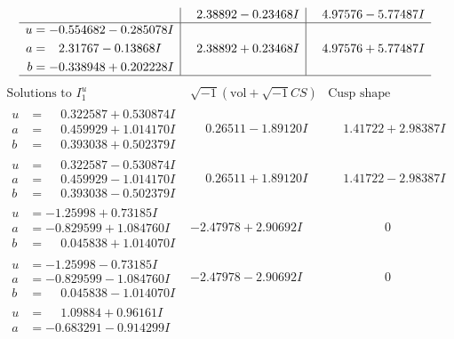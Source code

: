 \documentclass[1p]{elsarticle_modified}
\theoremstyle{definition}
\newcommand{\I}{\sqrt{-1}}
\begin{document}
$$\begin{array}{c|c|c}
 & \phantom{-}2.38892 - 0.23468 I & \phantom{-}4.97576 - 5.77487 I \\ \hline\begin{aligned}
u &= -0.554682 - 0.285078 I \\
a &= \phantom{-}2.31767 - 0.13868 I \\
b &= -0.338948 + 0.202228 I\end{aligned}
 & \phantom{-}2.38892 + 0.23468 I & \phantom{-}4.97576 + 5.77487 I\\
 \hline 
 \end{array}$$\newpage$$\begin{array}{c|c|c}  
\text{Solutions to }I^u_{1}& \I (\text{vol} + \sqrt{-1}CS) & \text{Cusp shape}\\
 \hline 
\begin{aligned}
u &= \phantom{-}0.322587 + 0.530874 I \\
a &= \phantom{-}0.459929 + 1.014170 I \\
b &= \phantom{-}0.393038 + 0.502379 I\end{aligned}
 & \phantom{-}0.26511 - 1.89120 I & \phantom{-}1.41722 + 2.98387 I \\ \hline\begin{aligned}
u &= \phantom{-}0.322587 - 0.530874 I \\
a &= \phantom{-}0.459929 - 1.014170 I \\
b &= \phantom{-}0.393038 - 0.502379 I\end{aligned}
 & \phantom{-}0.26511 + 1.89120 I & \phantom{-}1.41722 - 2.98387 I \\ \hline\begin{aligned}
u &= -1.25998 + 0.73185 I \\
a &= -0.829599 + 1.084760 I \\
b &= \phantom{-}0.045838 + 1.014070 I\end{aligned}
 & -2.47978 + 2.90692 I & \phantom{-0.000000 } 0 \\ \hline\begin{aligned}
u &= -1.25998 - 0.73185 I \\
a &= -0.829599 - 1.084760 I \\
b &= \phantom{-}0.045838 - 1.014070 I\end{aligned}
 & -2.47978 - 2.90692 I & \phantom{-0.000000 } 0 \\ \hline\begin{aligned}
u &= \phantom{-}1.09884 + 0.96161 I \\
a &= -0.683291 - 0.914299 I \\

\end{aligned}
\end{array}$$
\end{document}
